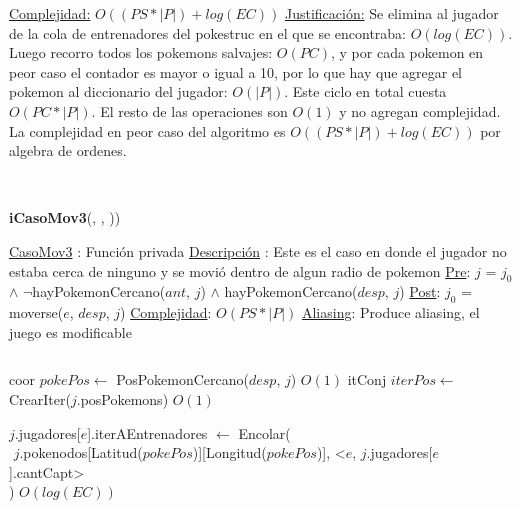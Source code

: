 \begin{Algoritmos}
\begin{algorithmic}[1]
\EndWhile 



\medskip
\Statex \underline{Complejidad:} $O((PS *|P|) + log(EC))$ 
\Statex \underline{Justificaci\'on:} Se elimina al jugador de la cola de entrenadores del pokestruc en el que se encontraba: $O(log(EC))$. Luego recorro todos los pokemons salvajes: $O(PC)$, y por cada pokemon en peor caso el contador es mayor o igual a 10, por lo que hay que agregar el pokemon al diccionario del jugador: $O(|P|)$. Este ciclo en total cuesta $O(PC*|P|)$. El resto de las operaciones son $O(1)$ y no agregan complejidad. La complejidad en peor caso del algoritmo es $O((PS *|P|) + log(EC))$ por algebra de ordenes.
\end{algorithmic}

$ $\newline
$ $\newline



{\textbf{iCasoMov3}(,  , ))}
\begin{algorithmic}[1]

\Statex \underline{CasoMov3} : Funci\'on privada 
\Statex \underline{Descripci\'on} : Este es el caso en donde el jugador no estaba cerca de ninguno y se movi\'o dentro de algun radio de pokemon
\Statex \underline{Pre}: $j$ = $j_0$ $\land$ $\neg$hayPokemonCercano($ant$, $j$) $\land$ hayPokemonCercano($desp$, $j$) 
\Statex \underline{Post}: $j_0$ = moverse($e$, $desp$, $j$) 
\Statex \underline{Complejidad}: $O(PS *|P|)$ 
\Statex \underline{Aliasing}: Produce aliasing, el juego es modificable

$ $\newline

\State coor $pokePos \gets$ PosPokemonCercano($desp$, $j$) \Comment $O(1)$
\State itConj $iterPos \gets$ CrearIter($j$.posPokemons) \Comment $O(1)$ 

\State $j$.jugadores[$e$].iterAEntrenadores $\gets$ Encolar(\\
$   $\hspace*{2cm}  $j$.pokenodos[Latitud($pokePos$)][Longitud($pokePos$)], <$e$, $j$.jugadores[$e$].cantCapt>\\
$   $\hspace*{1cm}) \Comment $O(log(EC))$


\end{algorithmic}
\end{Algoritmos}
